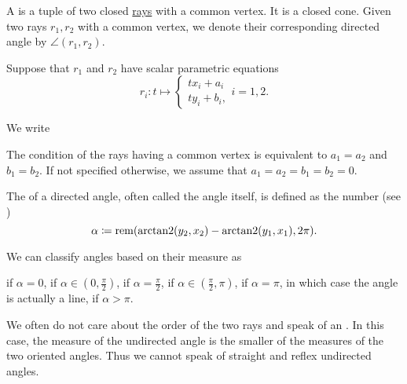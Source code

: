 \begin{definition}\label{def:angle}
  A  is a tuple of two closed \hyperref[def:geometric_ray]{rays} with a common vertex. It is a closed cone. Given two rays \( r_1, r_2 \) with a common vertex, we denote their corresponding directed angle by \( \angle(r_1, r_2) \).

  Suppose that \( r_1 \) and \( r_2 \) have scalar parametric equations
  \begin{equation*}
    r_i: t \mapsto
    \begin{cases}
      tx_i + a_i \\
      ty_i + b_i,
    \end{cases}
    i = 1, 2.
  \end{equation*}

  We write

  The condition of the rays having a common vertex is equivalent to \( a_1 = a_2 \) and \( b_1 = b_2 \). If not specified otherwise, we assume that \( a_1 = a_2 = b_1 = b_2 = 0 \).

  The  of a directed angle, often called the angle itself, is defined as the number (see )
  \begin{equation*}
    \alpha \coloneqq \operatorname{rem}(\operatorname{arctan2}(y_2, x_2) - \operatorname{arctan2}(y_1, x_1), 2\pi).
  \end{equation*}

  We can classify angles based on their measure as
  \begin{DefEnum}
      if \( \alpha = 0 \),
      if \( \alpha \in (0, \tfrac \pi 2) \),
      if \( \alpha = \tfrac \pi 2 \),
      if \( \alpha \in (\tfrac \pi 2, \pi) \),
      if \( \alpha = \pi \), in which case the angle is actually a line,
      if \( \alpha > \pi \).
  \end{DefEnum}

  We often do not care about the order of the two rays and speak of an . In this case, the measure of the undirected angle is the smaller of the measures of the two oriented angles. Thus we cannot speak of straight and reflex undirected angles.
\end{definition}

